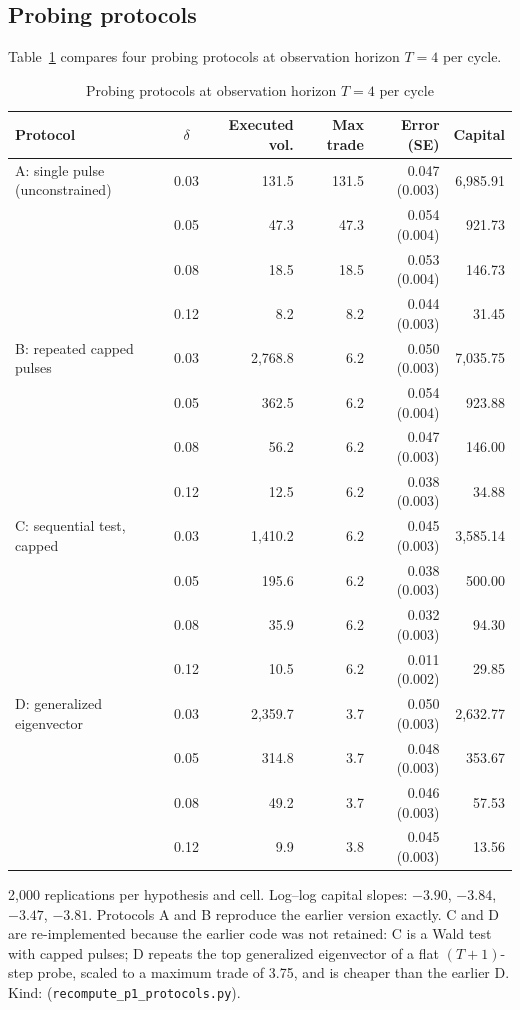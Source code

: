 \subsection{Probing protocols}
Table~\ref{tab:protocols} compares four probing protocols at observation horizon $T=4$ per cycle.

\begin{table}[!htbp]\centering\small
\begin{threeparttable}
\caption{Probing protocols at observation horizon $T=4$ per cycle}\label{tab:protocols}
\begin{tabular}{lcrrrr}
\toprule
Protocol & $\delta$ & Executed vol. & Max trade & Error (SE) & Capital\\
\midrule
A: single pulse (unconstrained) & 0.03 & 131.5 & 131.5 & 0.047 (0.003) & 6{,}985.91\\
 & 0.05 & 47.3 & 47.3 & 0.054 (0.004) & 921.73\\
 & 0.08 & 18.5 & 18.5 & 0.053 (0.004) & 146.73\\
 & 0.12 & 8.2 & 8.2 & 0.044 (0.003) & 31.45\\
B: repeated capped pulses & 0.03 & 2{,}768.8 & 6.2 & 0.050 (0.003) & 7{,}035.75\\
 & 0.05 & 362.5 & 6.2 & 0.054 (0.004) & 923.88\\
 & 0.08 & 56.2 & 6.2 & 0.047 (0.003) & 146.00\\
 & 0.12 & 12.5 & 6.2 & 0.038 (0.003) & 34.88\\
C: sequential test, capped & 0.03 & 1{,}410.2 & 6.2 & 0.045 (0.003) & 3{,}585.14\\
 & 0.05 & 195.6 & 6.2 & 0.038 (0.003) & 500.00\\
 & 0.08 & 35.9 & 6.2 & 0.032 (0.003) & 94.30\\
 & 0.12 & 10.5 & 6.2 & 0.011 (0.002) & 29.85\\
D: generalized eigenvector & 0.03 & 2{,}359.7 & 3.7 & 0.050 (0.003) & 2{,}632.77\\
 & 0.05 & 314.8 & 3.7 & 0.048 (0.003) & 353.67\\
 & 0.08 & 49.2 & 3.7 & 0.046 (0.003) & 57.53\\
 & 0.12 & 9.9 & 3.8 & 0.045 (0.003) & 13.56\\
\bottomrule
\end{tabular}
\begin{tablenotes}\footnotesize\item 2{,}000 replications per hypothesis and cell. Log--log capital slopes: $-3.90$, $-3.84$, $-3.47$, $-3.81$. Protocols A and B reproduce the earlier version exactly. C and D are re-implemented because the earlier code was not retained: C is a Wald test with capped pulses; D repeats the top generalized eigenvector of a flat $(T+1)$-step probe, scaled to a maximum trade of 3.75, and is cheaper than the earlier D. Kind:  (\texttt{recompute\_p1\_protocols.py}).\end{tablenotes}
\end{threeparttable}
\end{table}


